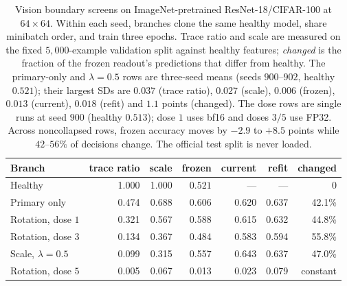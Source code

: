 \begin{table}[t]
\centering
\caption{Vision boundary screens on ImageNet-pretrained ResNet-18/CIFAR-100 at $64\times64$. Within each seed, branches clone the same healthy model, share minibatch order, and train three epochs. Trace ratio and scale are measured on the fixed $5{,}000$-example validation split against healthy features; \emph{changed} is the fraction of the frozen readout's predictions that differ from healthy. The primary-only and $\lambda=0.5$ rows are three-seed means (seeds $900$--$902$, healthy $0.521$); their largest SDs are $0.037$ (trace ratio), $0.027$ (scale), $0.006$ (frozen), $0.013$ (current), $0.018$ (refit) and $1.1$ points (changed). The dose rows are single runs at seed $900$ (healthy $0.513$); dose $1$ uses bf16 and doses $3/5$ use FP32. Across noncollapsed rows, frozen accuracy moves by $-2.9$ to $+8.5$ points while $42$--$56\%$ of decisions change. The official test split is never loaded.}
\label{tab:vision_boundary}
\footnotesize
\begin{tabular}{lrrrrrr}
\toprule
Branch & trace ratio & scale & frozen & current & refit & changed \\
\midrule
Healthy & 1.000 & 1.000 & $0.521$ & --- & --- & 0 \\
Primary only & 0.474 & 0.688 & 0.606 & 0.620 & 0.637 & 42.1\% \\
Rotation, dose $1$ & 0.321 & 0.567 & 0.588 & 0.615 & 0.632 & 44.8\% \\
Rotation, dose $3$ & 0.134 & 0.367 & 0.484 & 0.583 & 0.594 & 55.8\% \\
Scale, $\lambda=0.5$ & 0.099 & 0.315 & 0.557 & 0.643 & 0.637 & 47.0\% \\
Rotation, dose $5$ & 0.005 & 0.067 & 0.013 & 0.023 & 0.079 & constant \\
\bottomrule
\end{tabular}
\end{table}
